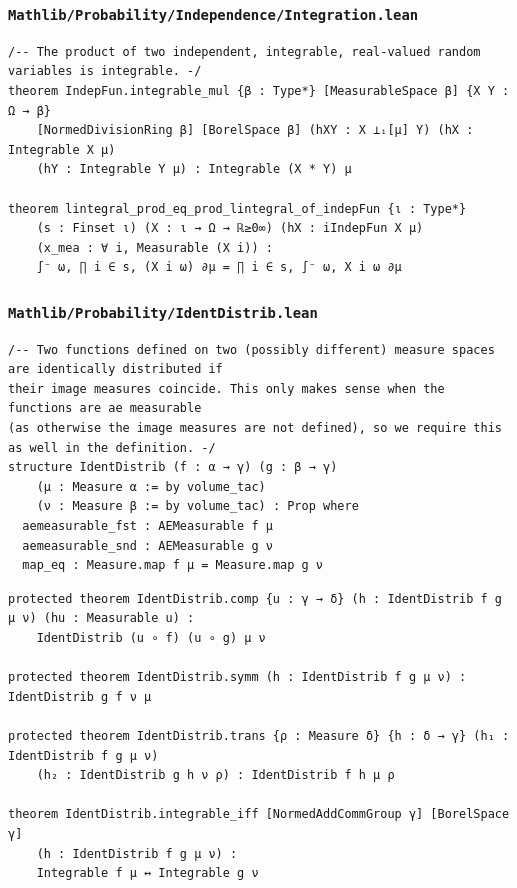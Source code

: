 \subsubsection{\texttt{Mathlib/Probability/Independence/Integration.lean}}
\begin{lstlisting}[language=lean]
/-- The product of two independent, integrable, real-valued random variables is integrable. -/
theorem IndepFun.integrable_mul {β : Type*} [MeasurableSpace β] {X Y : Ω → β}
    [NormedDivisionRing β] [BorelSpace β] (hXY : X ⟂ᵢ[μ] Y) (hX : Integrable X μ)
    (hY : Integrable Y μ) : Integrable (X * Y) μ

theorem lintegral_prod_eq_prod_lintegral_of_indepFun {ι : Type*}
    (s : Finset ι) (X : ι → Ω → ℝ≥0∞) (hX : iIndepFun X μ)
    (x_mea : ∀ i, Measurable (X i)) :
    ∫⁻ ω, ∏ i ∈ s, (X i ω) ∂μ = ∏ i ∈ s, ∫⁻ ω, X i ω ∂μ
\end{lstlisting}

\subsubsection{\texttt{Mathlib/Probability/IdentDistrib.lean}}
\begin{lstlisting}[language=lean]
/-- Two functions defined on two (possibly different) measure spaces are identically distributed if
their image measures coincide. This only makes sense when the functions are ae measurable
(as otherwise the image measures are not defined), so we require this as well in the definition. -/
structure IdentDistrib (f : α → γ) (g : β → γ)
    (μ : Measure α := by volume_tac)
    (ν : Measure β := by volume_tac) : Prop where
  aemeasurable_fst : AEMeasurable f μ
  aemeasurable_snd : AEMeasurable g ν
  map_eq : Measure.map f μ = Measure.map g ν
\end{lstlisting}

\begin{lstlisting}[language=lean]
protected theorem IdentDistrib.comp {u : γ → δ} (h : IdentDistrib f g μ ν) (hu : Measurable u) :
    IdentDistrib (u ∘ f) (u ∘ g) μ ν

protected theorem IdentDistrib.symm (h : IdentDistrib f g μ ν) : IdentDistrib g f ν μ

protected theorem IdentDistrib.trans {ρ : Measure δ} {h : δ → γ} (h₁ : IdentDistrib f g μ ν)
    (h₂ : IdentDistrib g h ν ρ) : IdentDistrib f h μ ρ

theorem IdentDistrib.integrable_iff [NormedAddCommGroup γ] [BorelSpace γ]
    (h : IdentDistrib f g μ ν) :
    Integrable f μ ↔ Integrable g ν
\end{lstlisting}

